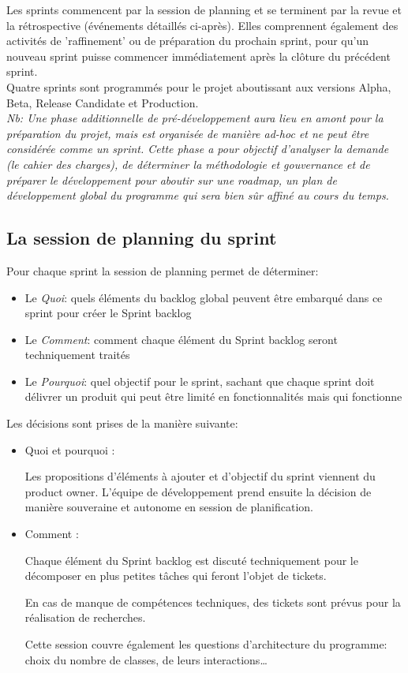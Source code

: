 Les sprints commencent par la session de planning et se terminent par la revue et la rétrospective (événements détaillés ci-après). Elles comprennent également des activités de 'raffinement' ou de préparation du prochain sprint,
 pour qu’un nouveau sprint puisse commencer immédiatement après la clôture du précédent sprint.\\

Quatre sprints sont programmés pour le projet aboutissant aux versions Alpha, Beta, Release Candidate et 
Production.\\

\emph{Nb: Une phase additionnelle de pré-développement aura lieu en amont pour la préparation du projet,
 mais est organisée de manière ad-hoc et ne peut être considérée comme un sprint. 
 Cette phase a pour objectif d’analyser la demande (le cahier des charges), de déterminer la méthodologie
 et gouvernance et de préparer le développement pour aboutir sur une roadmap, un plan de développement 
 global du programme qui sera bien sûr affiné au cours du temps.
}

\subsection{La session de planning du sprint}

Pour chaque sprint la session de planning permet de déterminer:

\begin{itemize}
    \item Le \emph{Quoi}: quels éléments du backlog global peuvent être embarqué dans ce sprint pour créer le Sprint backlog
    \item Le \emph{Comment}: comment chaque élément du Sprint backlog seront techniquement traités
    \item Le \emph{Pourquoi}: quel objectif pour le sprint, sachant que chaque sprint doit délivrer un produit qui peut être limité en fonctionnalités mais qui fonctionne
\end{itemize}

Les décisions sont prises de la manière suivante:
\begin{itemize}
      \item Quoi et pourquoi :
       
      Les propositions d'éléments à ajouter et d’objectif du sprint viennent du product owner. 
      L'équipe de développement prend ensuite la décision de manière souveraine et autonome 
      en session de planification.
       \item Comment :
       
       Chaque élément du Sprint backlog est discuté techniquement pour le décomposer en plus petites 
       tâches qui feront l’objet de tickets.
       
       En cas de manque de compétences techniques, des tickets sont prévus pour la réalisation de recherches.
       
       Cette session couvre également les questions d’architecture du programme: choix du nombre de classes, 
       de leurs interactions…

\end{itemize}

